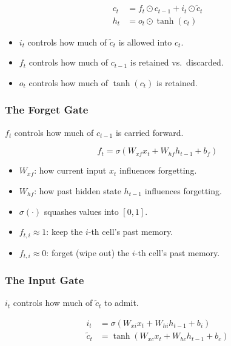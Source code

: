 \documentclass[
]{article}
\providecommand{\tightlist}{%
  \setlength{\itemsep}{0pt}\setlength{\parskip}{0pt}}
\begin{document}
\[
\begin{aligned}
c_t &= f_t \odot c_{t-1} + i_t \odot \tilde{c}_t \\
h_t &= o_t \odot \tanh(c_t)
\end{aligned}
\]

\begin{itemize}
\tightlist
\item
  \(i_t\) controls how much of \(\tilde{c}_t\) is allowed into \(c_t\).
\item
  \(f_t\) controls how much of \(c_{t-1}\) is retained vs.~discarded.
\item
  \(o_t\) controls how much of \(\tanh(c_t)\) is retained.
\end{itemize}

\subsubsection{The Forget Gate}\label{the-forget-gate}

\(f_t\) controls how much of \(c_{t-1}\) is carried forward.

\[f_t = \sigma(W_{xf}x_t + W_{hf}h_{t-1} + b_f)\]

\begin{itemize}
\item
  \(W_{xf}\): how current input \(x_t\) influences forgetting.\\
\item
  \(W_{hf}\): how past hidden state \(h_{t-1}\) influences forgetting.\\
\item
  \(\sigma(\cdot)\) squashes values into \([0,1]\).
\item
  \(f_{t,i} \approx 1\): keep the \(i\)-th cell's past memory.\\
\item
  \(f_{t,i} \approx 0\): forget (wipe out) the \(i\)-th cell's past
  memory.
\end{itemize}

\subsubsection{The Input Gate}\label{the-input-gate}

\(i_t\) controls how much of \(\tilde{c}_t\) to admit.

\[
\begin{aligned}
i_t & = \sigma(W_{xi}x_t + W_{hi}h_{t-1} + b_i) \\
\tilde{c}_t &= \tanh(W_{xc}x_t + W_{hc}h_{t-1} + b_c)
\end{aligned}
\]
\end{document}
